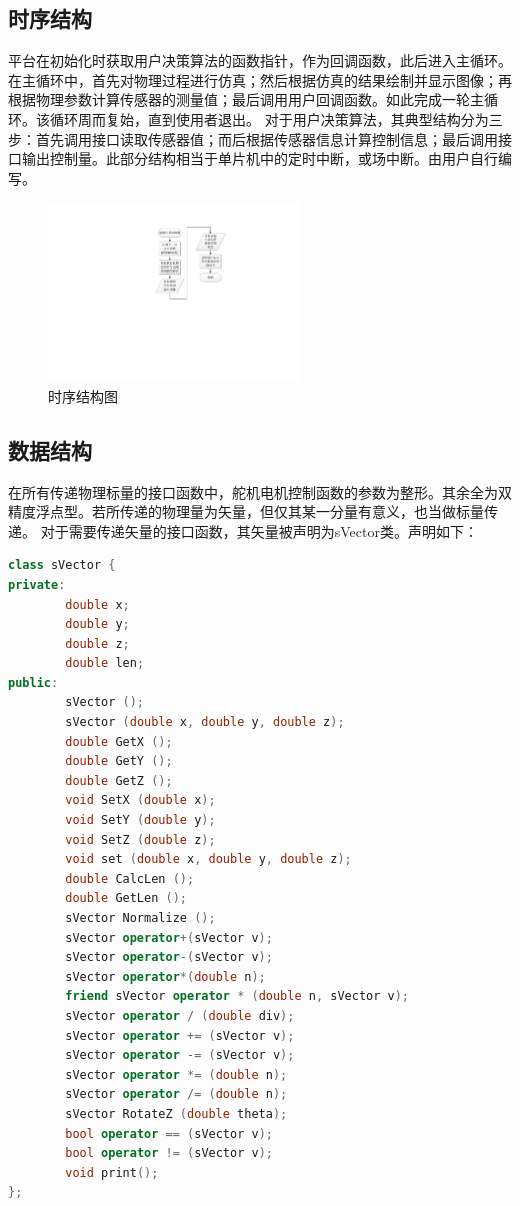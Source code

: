 \documentclass[titlepage,a4paper]{ctexart}
\begin{document}
\subsection{时序结构}
平台在初始化时获取用户决策算法的函数指针，作为回调函数，此后进入主循环。在主循环中，首先对物理过程进行仿真；然后根据仿真的结果绘制并显示图像；再根据物理参数计算传感器的测量值；最后调用用户回调函数。如此完成一轮主循环。该循环周而复始，直到使用者退出。
对于用户决策算法，其典型结构分为三步：首先调用接口读取传感器值；而后根据传感器信息计算控制信息；最后调用接口输出控制量。此部分结构相当于单片机中的定时中断，或场中断。由用户自行编写。
\begin{figure}[!htbp]
\centering
\includegraphics[width=0.60\textwidth,angle=270]{time.pdf}
\caption{时序结构图}
\end{figure}

\subsection{数据结构}
在所有传递物理标量的接口函数中，舵机电机控制函数的参数为整形。其余全为双精度浮点型。若所传递的物理量为矢量，但仅其某一分量有意义，也当做标量传递。
对于需要传递矢量的接口函数，其矢量被声明为sVector类。声明如下：

\begin{lstlisting}[language=C++]
class sVector {
private:
        double x;
        double y;
        double z;
        double len;
public:
        sVector ();
        sVector (double x, double y, double z);
        double GetX ();
        double GetY ();
        double GetZ ();
        void SetX (double x);
        void SetY (double y);
        void SetZ (double z);
        void set (double x, double y, double z);
        double CalcLen ();
        double GetLen ();
        sVector Normalize ();
        sVector operator+(sVector v);
        sVector operator-(sVector v);
        sVector operator*(double n);
        friend sVector operator * (double n, sVector v);
        sVector operator / (double div);
        sVector operator += (sVector v);
        sVector operator -= (sVector v);
        sVector operator *= (double n);
        sVector operator /= (double n);
        sVector RotateZ (double theta);
        bool operator == (sVector v);
        bool operator != (sVector v);
        void print();
};
\end{lstlisting}
\end{document}
